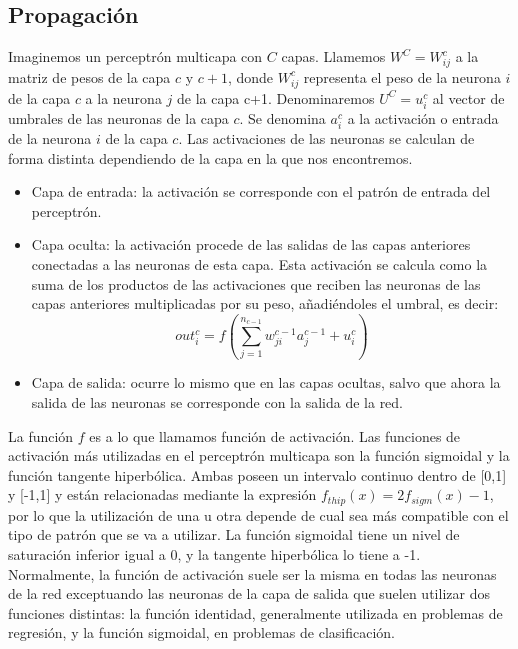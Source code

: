 \subsection{Propagación}
Imaginemos un perceptrón multicapa con ${C}$ capas. Llamemos ${W^{C} = W^{c}_{ij}}$ a la matriz de pesos de la capa ${c}$ y ${c+1}$, donde ${W^{c}_{ij}}$ representa el peso de la neurona ${i}$ de la capa ${c}$ a la neurona ${j}$ de la capa c+1. Denominaremos ${U^{C} = u^{c}_{i}}$ al vector de umbrales de las neuronas de la capa ${c}$. Se denomina ${a^{c}_{i}}$ a la activación o entrada de la neurona ${i}$ de la capa ${c}$. Las activaciones de las neuronas se calculan de forma distinta dependiendo de la capa en la que nos encontremos.
\begin{itemize}
\item Capa de entrada: la activación se corresponde con el patrón de entrada del perceptrón.
\item Capa oculta: la activación procede de las salidas de las capas anteriores conectadas a las neuronas de esta capa. Esta activación se calcula como la suma de los productos de las activaciones que reciben las neuronas de las capas anteriores multiplicadas por su peso, añadiéndoles el umbral, es decir:\\
\begin{equation}
out_{i}^{c} = f(\sum_{j=1}^{n_{c-1}}w_{ji}^{c-1}a_{j}^{c-1}+u_{i}^{c})
\end{equation}
\item Capa de salida: ocurre lo mismo que en las capas ocultas, salvo que ahora la salida de las neuronas se corresponde con la salida de la red.
\end{itemize}
La función ${f}$ es a lo que llamamos función de activación. Las funciones de activación más utilizadas en el perceptrón multicapa son la función sigmoidal y la función tangente hiperbólica. Ambas poseen un intervalo continuo dentro de [0,1] y [-1,1] y están relacionadas mediante la expresión ${f_{thip}(x)=2f_{sigm}(x)-1}$, por lo que la utilización de una u otra depende de cual sea más compatible con el tipo de patrón que se va a utilizar. La función sigmoidal tiene un nivel de saturación inferior igual a 0, y la tangente hiperbólica lo tiene a -1.\\
Normalmente, la función de activación suele ser la misma en todas las neuronas de la red exceptuando las neuronas de la capa de salida que suelen utilizar dos funciones distintas: la función identidad, generalmente utilizada en problemas de regresión, y la función sigmoidal, en problemas de clasificación.

